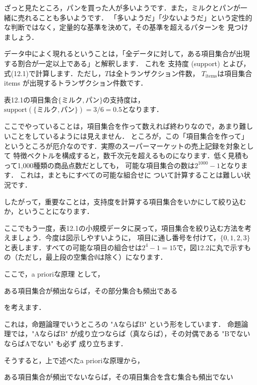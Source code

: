 
ざっと見たところ，パンを買った人が多いようです．また，ミルクとパンが一緒に売れることも多いようです．
「多いようだ」「少ないようだ」という定性的な判断ではなく，定量的な基準を決めて，その基準を超えるパターンを
見つけましょう．

データ中によく現れるということは，「全データに対して，ある項目集合が出現する割合が一定以上である」と解釈します．
これを
支持度 (support)
とよび，式(12.1)で計算します．ただし，$T$は全トランザクション件数，
$T_{\mbox{items}}$は項目集合 items が出現するトランザクション件数です．


表12.1の項目集合$\{ミルク, パン\}$の支持度は，$\mbox{support}(\{ミルク, パン\})= 3/6 =0.5$となります．


ここでやっていることは，項目集合を作って数えれば終わりなので，あまり難しいことをしているようには見えません．
ところが，この「項目集合を作って」というところが厄介なのです．実際のスーパーマーケットの売上記録を対象として
特徴ベクトルを構成すると，数千次元を超えるものになります．低く見積もって1,000種類の商品点数だとしても，
可能な項目集合の数は$2^{1000}-1$となります．
これは，まともにすべての可能な組合せに
ついて計算することは難しい状況です．

したがって，重要なことは，支持度を計算する項目集合をいかにして絞り込むか，ということになります．


ここでもう一度，表12.1の小規模データに戻って，項目集合を絞り込む方法を考えましょう．今度は図示しやすいように，
項目に通し番号を付けて，$\{0,1,2,3\}$と表します．すべての可能な項目の組合せは$2^4-1=15$で，図12.2に丸で示すもの（ただし，最上段の空集合$\emptyset$は除く）になります．


ここで，a prioriな原理
として，

ある項目集合が頻出ならば，その部分集合も頻出である

を考えます．


これは，命題論理でいうところの "AならばB" という形をしています．
命題論理では，"AならばB" が成り立つならば（真ならば），その対偶である "BでないならばAでない" も必ず
成り立ちます．


そうすると，上で述べたa prioriな原理から，

ある項目集合が頻出でないならば，その項目集合を含む集合も頻出でない

